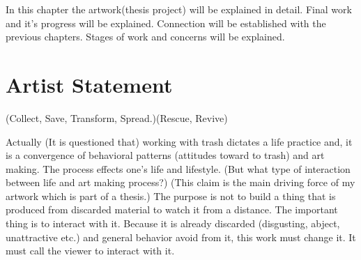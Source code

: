 In this chapter the artwork(thesis project) will be explained in detail. Final work and it's progress will be explained. Connection will be established with the previous chapters. Stages of work and concerns will be explained. 





\section{Artist Statement}
(Collect, Save, Transform, Spread.)(Rescue, Revive)




Actually (It is questioned that) working with trash dictates a life practice and, it is a convergence of behavioral patterns (attitudes toward to trash) and art making. The process effects one's life and lifestyle. (But what type of interaction between life and art making process?) (This claim is the main driving force of my artwork which is part of a thesis.) The purpose is not to build a thing that is produced from discarded material to watch it from a distance. The important thing is to interact with it. Because it is already discarded (disgusting, abject, unattractive etc.) and general behavior avoid from it, this work must change it. It must call the viewer to interact with it.


